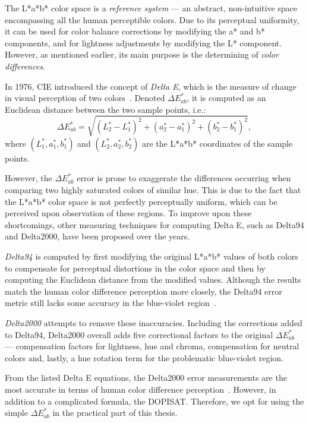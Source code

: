 The L*a*b* color space is a \emph{reference system} --- an abstract, non-intuitive space encompassing all the human perceptible colors. Due to its perceptual uniformity, it can be used for color balance corrections by modifying the a* and b* components, and for lightness adjustments by modifying the L* component. However, as mentioned earlier, its main purpose is the determining of \emph{color differences}.

In 1976, CIE introduced the concept of \emph{Delta E}, which is the measure of change in visual perception of two colors~\cite{deltaEOverview}. Denoted $\Delta E_{ab}^*$, it is computed as an Euclidean distance between the two sample points, i.e.:
\begin{equation} \label{deltaE}
\Delta E_{ab}^*=\sqrt{(L_{2}^* - L_{1}^*)^2 + (a_{2}^* - a_{1}^*)^2 + (b_{2}^* - b_{1}^*)^2},
\end{equation}
where $(L_{1}^*,a_{1}^*,b_{1}^*)$ and $(L_{2}^*,a_{2}^*,b_{2}^*)$ are the L*a*b* coordinates of the sample points.

However, the $\Delta E_{ab}^*$ error is prone to exaggerate the differences occurring when comparing two highly saturated colors of similar hue. This is due to the fact that the L*a*b* color space is not perfectly perceptually uniform, which can be perceived upon observation of these regions. To improve upon these shortcomings, other measuring techniques for computing Delta E, such as Delta94 and Delta2000, have been proposed over the years.

\emph{Delta94} is computed by first modifying the original L*a*b* values of both colors to compensate for perceptual distortions in the color space and then by computing the Euclidean distance from the modified values. Although the results match the human color difference perception more closely, the Delta94 error metric still lacks some accuracy in the blue-violet region~\cite{deltaEOverview}.
	
\emph{Delta2000} attempts to remove these inaccuracies. Including the corrections added to Delta94, Delta2000 overall adds five correctional factors to the original $\Delta E_{ab}^*$ --- compensation factors for lightness, hue and chroma, compensation for neutral colors and, lastly, a hue rotation term for the problematic blue-violet region.

From the listed Delta E equations, the Delta2000 error measurements are the most accurate in terms of human color difference perception~\cite{deltaEOverview}. However, in addition to a complicated formula, the  DOPISAT. Therefore, we opt for using the simple $\Delta E_{ab}^*$ in the practical part of this thesis.

